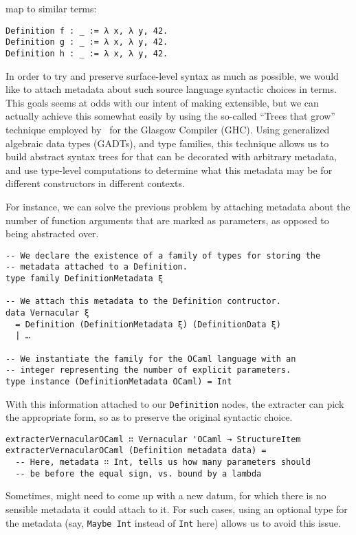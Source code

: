 map to similar \Chick{} terms:

\begin{verbatim}
Definition f : _ := λ x, λ y, 42.
Definition g : _ := λ x, λ y, 42.
Definition h : _ := λ x, λ y, 42.
\end{verbatim}

In order to try and preserve surface-level syntax as much as possible, we would
like to attach metadata about such source language syntactic choices in \Chick{}
terms.  This goals seems at odds with our intent of making \Coop{} extensible,
but we can actually achieve this somewhat easily by using the so-called ``Trees
that grow'' technique employed by~ for the Glasgow
\Haskell{} Compiler (GHC).  Using generalized algebraic data types (GADTs), and
type families, this technique allows us to build abstract syntax trees for
\Chick{} that can be decorated with arbitrary metadata, and use type-level
computations to determine what this metadata may be for different constructors
in different contexts.

For instance, we can solve the previous problem by attaching metadata about the
number of function arguments that are marked as parameters, as opposed to being
abstracted over.

\begin{verbatim}
-- We declare the existence of a family of types for storing the
-- metadata attached to a Definition.
type family DefinitionMetadata ξ

-- We attach this metadata to the Definition contructor.
data Vernacular ξ
  = Definition (DefinitionMetadata ξ) (DefinitionData ξ)
  | …

-- We instantiate the family for the OCaml language with an
-- integer representing the number of explicit parameters.
type instance (DefinitionMetadata OCaml) = Int
\end{verbatim}

With this information attached to our \texttt{Definition} nodes,
the extracter can pick the appropriate form, so as to preserve the original
syntactic choice.

\begin{verbatim}
extracterVernacularOCaml ∷ Vernacular 'OCaml → StructureItem
extracterVernacularOCaml (Definition metadata data) =
  -- Here, metadata ∷ Int, tells us how many parameters should
  -- be before the equal sign, vs. bound by a lambda
\end{verbatim}

Sometimes, \Chick{} might need to come up with a new datum, for which there is
no sensible metadata it could attach to it.  For such cases, using an optional
type for the metadata (say, \texttt{Maybe Int} instead of
\texttt{Int} here) allows us to avoid this issue.

